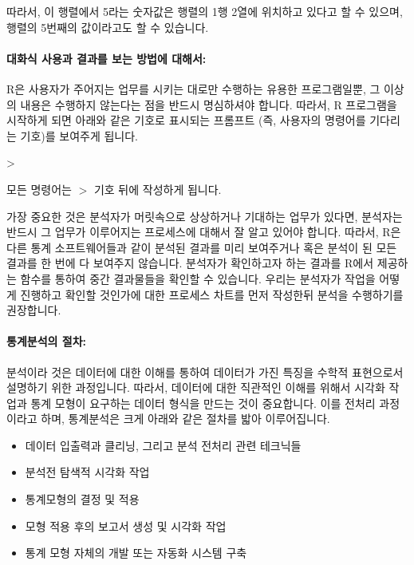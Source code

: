 \documentclass{report}
\begin{document}
따라서, 이 행렬에서 5라는 숫자값은 행렬의 1행 2열에 위치하고 있다고 할 수 있으며, 행렬의 5번째의 값이라고도 할 수 있습니다. 

\paragraph{대화식 사용과 결과를 보는 방법에 대해서:} R은 사용자가 주어지는 업무를 시키는 대로만 수행하는 유용한 프로그램일뿐, 그 이상의 내용은 수행하지 않는다는 점을 반드시 명심하셔야 합니다. 
따라서, R 프로그램을 시작하게 되면 아래와 같은 기호로 표시되는 프롬프트 (즉, 사용자의 명령어를 기다리는 기호)를 보여주게 됩니다. 
\begin{Schunk}
\begin{Soutput}
>
\end{Soutput}
\end{Schunk}

모든 명령어는 $>$ 기호 뒤에 작성하게 됩니다. 

가장 중요한 것은 분석자가 머릿속으로 상상하거나 기대하는 업무가 있다면, 분석자는 반드시 그 업무가 이루어지는 프로세스에 대해서 잘 알고 있어야 합니다.
따라서, R은 다른 통계 소프트웨어들과 같이 분석된 결과를 미리 보여주거나 혹은 분석이 된 모든 결과를 한 번에 다 보여주지 않습니다.
분석자가 확인하고자 하는 결과를 R에서 제공하는 함수를 통하여 중간 결과물들을 확인할 수 있습니다. 
우리는 분석자가 작업을 어떻게 진행하고 확인할 것인가에 대한 프로세스 차트를 먼저 작성한뒤 분석을 수행하기를 권장합니다.

\paragraph{통계분석의 절차:} 분석이라 것은 데이터에 대한 이해를 통하여 데이터가 가진 특징을 수학적 표현으로서 설명하기 위한 과정입니다. 
따라서, 데이터에 대한 직관적인 이해를 위해서 시각화 작업과 통계 모형이 요구하는 데이터 형식을 만드는 것이 중요합니다. 
이를 전처리 과정이라고 하며, 통계분석은 크게 아래와 같은 절차를 밟아 이루어집니다.

\begin{itemize}
\item 데이터 입출력과 클리닝, 그리고 분석 전처리 관련 테크닉들
\item 분석전 탐색적 시각화 작업 
\item 통계모형의 결정 및 적용 
\item 모형 적용 후의 보고서 생성 및 시각화 작업
\item 통계 모형 자체의 개발 또는 자동화 시스템 구축
\end{itemize}
\end{document}
